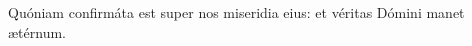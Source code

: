 \item {}

\item Quóniam confirmáta est super nos miseridia eius:\psstar{} et véritas Dómini manet  ætérnum.